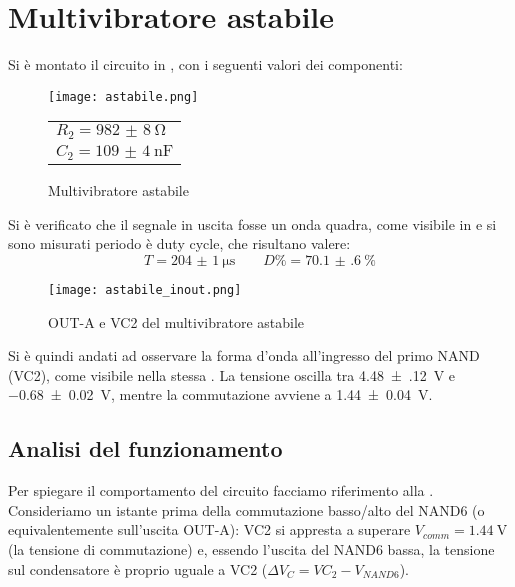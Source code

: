 \newpage
\section{Multivibratore astabile}
Si è montato il circuito in , con i seguenti valori dei componenti:

\begin{figure}[H]
	\begin{minipage}{0.8\textwidth}
		\centering
		\texttt{[image: astabile.png]}
		\caption{Multivibratore astabile}
		\label{astab_sch}
	\end{minipage}
	\begin{minipage}{0.1\textwidth}
		\begin{tabular}{l}
			$R_2 = \SI{982(8)}{\ohm}$\\
			$C_2 = \SI{109(4)}{\nano \farad}$
		\end{tabular}
	\end{minipage}
\end{figure}

Si è verificato che il segnale in uscita fosse un onda quadra, come visibile in  e si sono misurati periodo è duty cycle, che risultano valere:
$$T = \SI{204(1)}{\micro \second} \qquad D\% = \SI{70.1(6)}{\%}$$

\begin{figure}[H]
	\centering
	\texttt{[image: astabile\_inout.png]}
	\caption{OUT-A e VC2 del multivibratore astabile}
	\label{astab_osc}
\end{figure}

Si è quindi andati ad osservare la forma d'onda all'ingresso del primo NAND (VC2), come visibile nella stessa .
La tensione oscilla tra \SI{4.48(12)}{\volt} e \SI{-0.68(2)}{\volt}, mentre la commutazione avviene a \SI{1.44(4)}{\volt}.

\subsection{Analisi del funzionamento}

Per spiegare il comportamento del circuito facciamo riferimento alla .
Consideriamo un istante prima della commutazione basso/alto del NAND6 (o equivalentemente sull'uscita OUT-A): VC2 si appresta a superare $V_{comm}=\SI{1.44}{\volt}$ (la tensione di commutazione) e, essendo l'uscita del NAND6 bassa, la tensione sul condensatore è proprio uguale a VC2 ($\Delta V_C = VC_2 - V_{NAND6}$).

